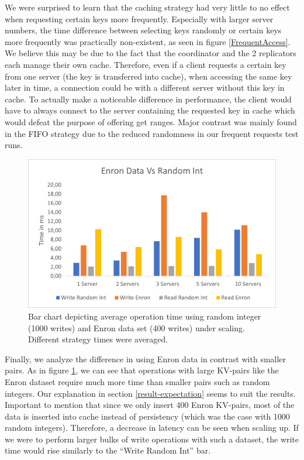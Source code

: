\documentclass[sigconf]{acmart}
\begin{document}
We were surprised to learn that the caching strategy had very little to no effect when requesting certain keys more frequently. Especially with larger server numbers, the time difference between selecting keys randomly or certain keys more frequently was practically non-existent, as seen in figure \ref{FrequentAccess}. We believe this may be due to the fact that the coordinator and the 2 replicators each manage their own cache. Therefore, even if a client requests a certain key from one server (the key is transferred into cache), when accessing the same key later in time, a connection could be with a different server without this key in cache. To actually make a noticeable difference in performance, the client would have to always connect to the server containing the requested key in cache which would defeat the purpose of offering get ranges. Major contrast was mainly found in the FIFO strategy due to the reduced randomness in our frequent requests test runs.

\begin{center}
  \begin{figure}[htbp]
    \centerline{\includegraphics[scale=0.6]{attachments/Enron.png}}
    \caption{Bar chart depicting average operation time using random integer (1000 writes) and Enron data set (400 writes) under scaling. Different strategy times were averaged.}
    \label{Enron}
  \end{figure}
\end{center}

Finally, we analyze the difference in using Enron data in contrast with smaller pairs. As in figure \ref{Enron}, we can see that operations with large KV-pairs like the Enron dataset require much more time than smaller pairs such as random integers. Our explanation in section \ref{result-expectation} seems to suit the results. Important to mention that since we only insert 400 Enron KV-pairs, most of the data is inserted into cache instead of persistency (which was the case with 1000 random integers). Therefore, a decrease in latency can be seen when scaling up. If we were to perform larger bulks of write operations with such a dataset, the write time would rise similarly to the “Write Random Int” bar.
\end{document}
